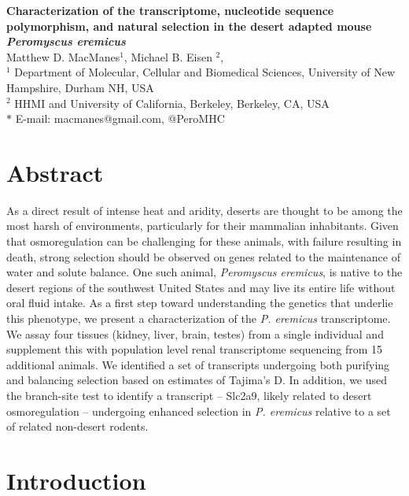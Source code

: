 \documentclass[11pt]{article}
\date{}
\newcommand{\peer}{\textit{P. eremicus}}
\begin{document}
\begin{flushleft}
{\Large
\textbf{Characterization of the transcriptome, nucleotide sequence polymorphism, and natural selection in the desert adapted mouse \textit{Peromyscus eremicus}}
}
\\
Matthew D. MacManes$^{1}$, 
Michael B. Eisen $^{2}$, 
\\
$^{1}$ Department of Molecular, Cellular and Biomedical Sciences, University of New Hampshire, Durham NH, USA
\\
$^{2}$ HHMI and University of California, Berkeley, Berkeley, CA, USA
\\
$\ast$ E-mail: macmanes@gmail.com, @PeroMHC
\end{flushleft}

\linenumbers

\section*{Abstract}

As a direct result of intense heat and aridity, deserts are thought to be among the most harsh of environments, particularly for their mammalian inhabitants. Given that osmoregulation can be challenging for these animals, with failure resulting in death, strong selection should be observed on genes related to the maintenance of water and solute balance. One such animal, \textit{Peromyscus eremicus}, is native to the desert regions of the southwest United States and may live its entire life without oral fluid intake. As a first step toward understanding the genetics that underlie this phenotype, we present a characterization of the \peer\: transcriptome. We assay four tissues (kidney, liver, brain, testes) from a single individual and supplement this with population level renal transcriptome sequencing from 15 additional animals. We identified a set of transcripts undergoing both purifying and balancing selection based on estimates of Tajima's D. In addition, we used the branch-site test to identify a transcript -- Slc2a9, likely related to desert osmoregulation -- undergoing enhanced selection in \peer\: relative to a set of related non-desert rodents.  \\


\section*{Introduction}
\end{document}
